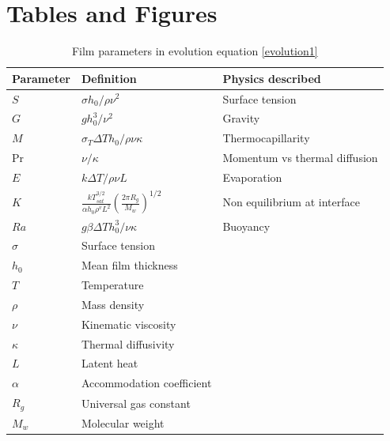 \documentclass[a4paper,12pt]{article}
\begin{document}
                
%                 
%                
	


\clearpage


\section{Tables and Figures}

\begin{table}[h]
\centering
\begin{tabular}{|l|p{4cm}|p{4cm}|}
\hline
 Parameter & Definition & Physics described\\
\hline
$S$ & $\sigma h_0/\rho \nu^2$ & Surface tension \\
$G$ & $g h_0^3/\nu^2$  & Gravity\\
$M$ & $\sigma_T \Delta T h_0/\rho\nu\kappa$  & Thermocapillarity\\
Pr & $\nu/\kappa$ &  Momentum vs thermal diffusion\\
$E$ & $k \Delta T/\rho\nu L$ & Evaporation\\
$K$ & $\frac{k T_{sat}^{3/2}}{\alpha h_0 \rho^v L^2} \left(\frac{2 \pi R_g}{M_w}\right)^{1/2}$ & Non equilibrium at interface \\
$Ra$ & $g \beta \Delta T h_0^3/\nu\kappa$ & Buoyancy \\
$\sigma$ & Surface tension & \\
$h_0$ & Mean film thickness & \\
$T$ & Temperature & \\
$\rho$ & Mass density & \\
$\nu$ & Kinematic viscosity & \\
$\kappa$ & Thermal diffusivity & \\
$L$ & Latent heat & \\
$\alpha$ & Accommodation coefficient & \\
$R_g$ & Universal gas constant & \\
$M_w$ & Molecular weight & \\
\hline
\end{tabular}
\caption{Film parameters in evolution equation \ref{evolution1}}
\label{tab:nomenclature}
\end{table}
\clearpage
\end{document}
